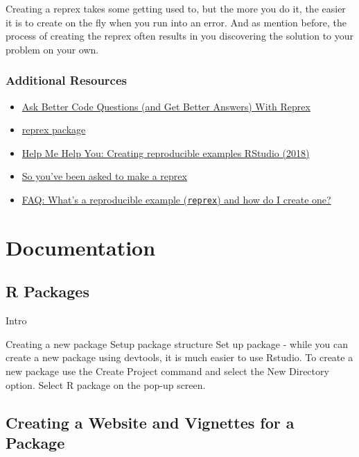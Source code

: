\documentclass[
  letterpaper,
  DIV=11,
  numbers=noendperiod]{scrreprt}
\providecommand{\tightlist}{%
  \setlength{\itemsep}{0pt}\setlength{\parskip}{0pt}}\usepackage{longtable,booktabs,array}
\begin{document}
Creating a reprex takes some getting used to, but the more you do it,
the easier it is to create on the fly when you run into an error. And as
mention before, the process of creating the reprex often results in you
discovering the solution to your problem on your own.

\hypertarget{additional-resources-5}{%
\section{Additional Resources}\label{additional-resources-5}}

\begin{itemize}
\tightlist
\item
  \href{https://data.library.virginia.edu/ask-better-code-questions-and-get-better-answers-with-reprex/}{Ask
  Better Code Questions (and Get Better Answers) With Reprex}
\item
  \href{https://reprex.tidyverse.org/index.html}{reprex package}
\item
  \href{https://www.youtube.com/watch?v=5gqksthQ0cM}{Help Me Help You:
  Creating reproducible examples \textbar{} RStudio (2018)}
\item
  \href{https://www.jessemaegan.com/blog/so-you-ve-been-asked-to-make-a-reprex/}{So
  you've been asked to make a reprex}
\item
  \href{https://community.rstudio.com/t/faq-whats-a-reproducible-example-reprex-and-how-do-i-create-one/5219}{FAQ:
  What's a reproducible example (\texttt{reprex}) and how do I create
  one?}
\end{itemize}

\part{Documentation}

\hypertarget{r-packages}{%
\chapter{R Packages}\label{r-packages}}

Intro

Creating a new package Setup package structure Set up package - while
you can create a new package using devtools, it is much easier to use
Rstudio. To create a new package use the Create Project command and
select the New Directory option. Select R package on the pop-up screen.

\hypertarget{creating-a-website-and-vignettes-for-a-package}{%
\chapter{Creating a Website and Vignettes for a
Package}\label{creating-a-website-and-vignettes-for-a-package}}
\end{document}
